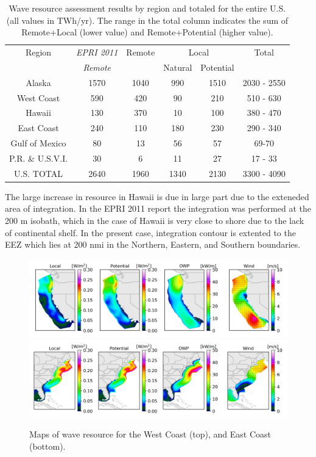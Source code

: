 \begin{table}[ht]
  \centering
  \begin{tabular}{|c|c|c|c|c|c|}
    \hline
    Region & {\it EPRI 2011}  & Remote & \multicolumn{2}{c|}{Local} & Total \\
    & {\it Remote} & & Natural & Potential & \\
    \hline
    Alaska & 1570 & 1040 & 990 & 1510 & 2030 - 2550 \\
    West Coast & 590 & 420 & 90 & 210 & 510 - 630 \\
    Hawaii & 130 & 370 & 10 & 100 & 380 - 470 \\
    East Coast & 240 & 110 & 180 & 230 & 290 - 340 \\
    Gulf of Mexico & 80 & 13 & 56 & 57 & 69-70 \\
    P.R. \& U.S.V.I. & 30 & 6 & 11 & 27 & 17 - 33 \\
    \hline \hline
U.S. TOTAL & 2640 & 1960 & 1340 & 2130 & 3300 - 4090 \\
\hline
  \end{tabular}
  \caption{Wave resource assessment results by region and totaled for the entire U.S. (all values in TWh/yr). The range in the total column indicates the sum of Remote+Local (lower value) and Remote+Potential (higher value). }
  \label{table:totals}
\end{table}

The large increase in resource in Hawaii is due in large part due to the exteneded area of integration. In the EPRI 2011 report the integration was performed at the 200 m isobath, which in the case of Hawaii is very close to shore due to the lack of continental shelf. In the present case, integration contour is extented to the EEZ which lies at 200 nmi in the Northern, Eastern, and Southern boundaries.

\begin{figure}[ht]
  \centering
  \includegraphics[width=\textwidth]{../fig/WC-Map01-November.png}
  \includegraphics[width=\textwidth]{../fig/EC-Map01-November.png}
  \caption{Maps of wave resource for the West Coast (top), and East Coast (bottom). }
  \label{fig:maps}
\end{figure}

